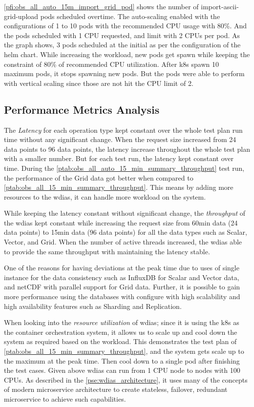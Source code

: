 \documentclass[conference]{IEEEtran}
\begin{document}
\cref{pfi:obs_all_auto_15m_import_grid_pod} shows the number of import-ascii-grid-upload pods scheduled overtime. The auto-scaling enabled with the configurations of 1 to 10 pods with the recommended CPU usage with 80\%. And the pods scheduled with 1 CPU requested, and limit with 2 CPUs per pod.
As the graph shows, 3 pods scheduled at the initial as per the configuration of the helm chart. While increasing the workload, new pods get spawn while keeping the constraint of 80\% of recommended CPU utilization. After \acrshort{k8s} spawn 10 maximum pods, it stops spawning new pods. But the pods were able to perform with vertical scaling since those are not hit the CPU limit of 2.

\subsection{Performance Metrics Analysis}
\label{psubse:performance_metrics}

The \emph{Latency} for each operation type kept constant over the whole test plan run time without any significant change. When the request size increased from 24 data points to 96 data points, the latency increase throughout the whole test plan with a smaller number. But for each test run, the latency kept constant over time.
During the \cref{ptab:obs_all_auto_15_min_summary_throughput} test run, the performance of the Grid data got better when compared to \cref{ptab:obs_all_15_min_summary_throughput}. This means by adding more resources to the \acrshort{wdias}, it can handle more workload on the system.

While keeping the latency constant without significant change, the \emph{throughput} of the \acrshort{wdias} kept constant while increasing the request size from 60min data (24 data points) to 15min data (96 data points) for all the data types such as Scalar, Vector, and Grid.
When the number of active threads increased, the \acrshort{wdias} able to provide the same throughput with maintaining the latency stable.

One of the reasons for having deviations at the peak time due to uses of single instance for the data consistency such as  InfluxDB for Scalar and Vector data, and netCDF with parallel support for Grid data. Further, it is possible to gain more performance using the databases with configure with high scalability and high availability features such as Sharding and Replication.

When looking into the \emph{resource utilization} of \acrshort{wdias}; since it is using the \acrshort{k8s} as the container orchestration system, it allows us to scale up and cool down the system as required based on the workload. This demonstrates the test plan of \cref{ptab:obs_all_15_min_summary_throughput}, and the system gets scale up to the maximum at the peak time. Then cool down to a single pod after finishing the test cases.
Given above \acrshort{wdias} can run from 1 CPU node to nodes with 100 CPUs. As described in the \cref{pse:wdias_architecture}, it uses many of the concepts of modern microservice architecture to create stateless, failover, redundant microservice to achieve such capabilities.
\end{document}
